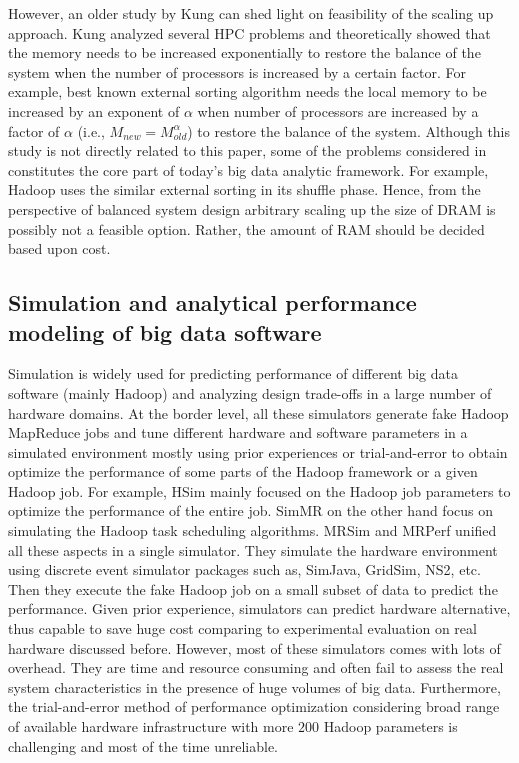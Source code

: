 \documentclass[journal]{IEEEtran}
\begin{document}
However, an older study by Kung \cite{Balance:kung1986memory} can shed light on feasibility of the scaling up approach. Kung analyzed several HPC problems and theoretically showed that the memory needs to be increased exponentially to restore the balance of the system when the number of processors is increased by a certain factor. For example, best known external sorting algorithm needs the local memory to be increased by an exponent of $\alpha$ when number of processors are increased by a factor of  $\alpha$ (i.e., $M_{new} = M_{old}^{\alpha}$) to restore the balance of the system. Although this study is not directly related to this paper, some of the problems considered in \cite{Balance:kung1986memory} constitutes the core part of today's big data analytic framework. For example, Hadoop uses the similar external sorting in its shuffle phase. Hence, from the perspective of balanced system design arbitrary scaling up the size of DRAM is possibly not a feasible option. Rather, the amount of RAM should be decided based upon cost.

\subsection{Simulation and analytical performance modeling of big data software}
Simulation is widely used for predicting performance of different big data software (mainly Hadoop) and analyzing design trade-offs in a large number of hardware domains. At the border level, all these simulators generate fake Hadoop MapReduce jobs and tune different hardware and software parameters in a simulated environment mostly using prior experiences or trial-and-error to obtain optimize the performance of some parts of the Hadoop framework or a given Hadoop job. For example, HSim \cite{Simulator:liu2013hsim} mainly focused on the Hadoop job parameters to optimize the performance of the entire job. SimMR \cite{Simulator:verma2011play} on the other hand focus on simulating the Hadoop task scheduling algorithms. MRSim\cite{Simulator:hammoud2010mrsim} and MRPerf \cite{Simulator:wang2009simulation} unified all these aspects in a single simulator. They simulate the hardware environment using discrete event simulator packages such as,  SimJava, GridSim, NS2, etc. Then  they execute the fake Hadoop job on a small subset of data to predict the performance. Given prior experience, simulators can predict hardware alternative, thus capable to save huge cost comparing to experimental evaluation on real hardware discussed before. However, most of these simulators comes with lots of overhead. They are time and resource consuming and often fail to assess the real system characteristics in the presence of huge volumes of big data. Furthermore, the trial-and-error method of performance optimization considering broad range of available hardware infrastructure with more $200$ Hadoop parameters is challenging and most of the time unreliable.
\end{document}
